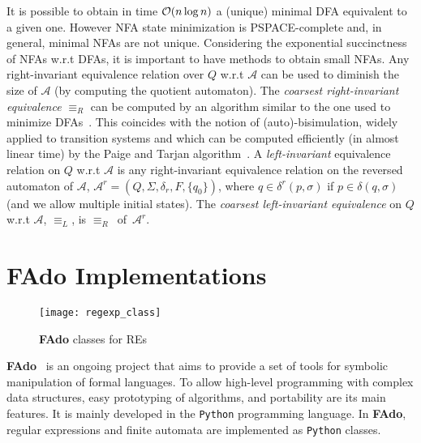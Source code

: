 \documentclass{llncs}
\newcommand{\FAdo}{{\bf FAdo}\xspace}
\newcommand{\dfa}{DFA\xspace}
\newcommand{\dfas}{DFAs\xspace}
\newcommand{\NFA}{NFA\xspace}
\newcommand{\nfas}{NFAs\xspace}
\newcommand{\res}{REs\xspace}
\newcommand{\python}{\texttt{Python}\xspace}
\newcommand{\nfa}{\mathcal{A}}
\newcommand{\Alphabet}{\Sigma}
\newcommand{\letter}{\sigma}
\begin{document}
It is possible to obtain in time ${\cal O}(n\log n)$ a (unique)
minimal \dfa equivalent to a given one. However \NFA state minimization  is
PSPACE-complete and, in general, minimal \nfas are not unique.
Considering the exponential succinctness of \nfas w.r.t \dfas, it is
important to have methods to obtain small \nfas.  Any right-invariant
equivalence relation over $Q$ w.r.t $\nfa$ can be used to diminish
the size of $\nfa$ (by computing the quotient automaton). The
\emph{coarsest right-invariant equivalence} $\equiv_R$ can be computed
by an algorithm similar to the one used to minimize
\dfas~\cite{reduce_nfa}. This coincides with the notion of
(auto)-bisimulation, widely applied to transition systems and which
can be computed efficiently (in almost linear time) by the Paige and Tarjan
algorithm~\cite{tarjan87}. A \emph{left-invariant} equivalence relation on $Q$
w.r.t $\nfa$ is any right-invariant equivalence relation on the
reversed automaton of $\nfa$,
$\nfa^r=(Q,\Alphabet,\delta_r,F,\{q_0\})$, where $q\in
\delta^r(p,\letter)$ if $p\in \delta(q,\letter)$ (and we allow
multiple initial states). The \emph{coarsest left-invariant
  equivalence} on $Q$ w.r.t $\nfa$, $\equiv_L$, is  $\equiv_R$~of~$\nfa^r$.
\section{\FAdo Implementations}
\label{sec:fado}
\begin{figure}
\vspace{-0.2cm}
\begin{center}
\texttt{[image: regexp\_class]}   
\end{center}
\vspace{-0.2cm}
\caption{\FAdo classes for \res}
\label{fig:regexpclass}
\vspace{-0.2cm}
\end{figure}

\FAdo~\cite{fado,moreira05_c:_inter_manip_regul_objec_fado,almeida09:_fado_guitar_c}
is an ongoing project that aims to provide a set of tools for symbolic
manipulation of formal languages. To allow high-level programming with
complex data structures, easy prototyping of algorithms, and
portability are its main features. It is mainly developed in the
\python programming language.  In \FAdo, regular expressions and
finite automata are implemented as \python classes.
\end{document}
